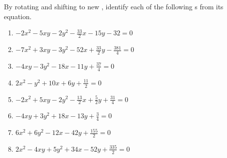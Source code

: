 \begin{exercise} \label{ex:} 
By rotating and shifting to new , identify each of the following s from its equation.
\begin{enumerate}
\item \( -2x^2 -5xy -2y^2 -\frac{33}2x -15y -32=0\)

\item \( -7x^2 +3xy -3y^2 -52x +\frac{33}2y -\frac{381}4=0\)

\item \( -4xy -3y^2 -18x -11y +\frac{37}4=0\)

\item \( 2x^2 -y^2 +10x +6y +\frac{11}2=0\)

\item \( -2x^2 +5xy -2y^2 -\frac{13}2x +\frac52y +\frac{31}4=0\)

\item \(-4xy +3y^2 +18x -13y +\frac34=0\)

\item \( 6x^2 +6y^2 -12x -42y +\frac{155}2=0\)

\item \( 2x^2 -4xy +5y^2 +34x -52y +\frac{335}2=0\)


\end{enumerate}
\end{exercise}






